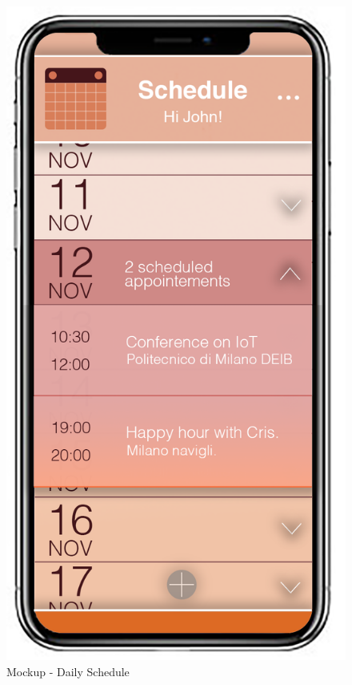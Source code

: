 \begin{figure}[H]
\begin{minipage}{0.5\textwidth}
		\centerline{\includegraphics[width=0.3\paperwidth]{Images/DailySchedule}}
		\caption{Mockup - Daily Schedule}
	\end{minipage}
\end{figure}
